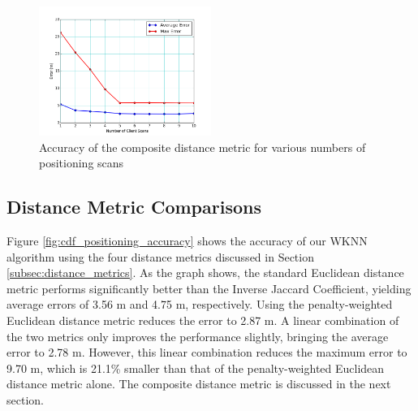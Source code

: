 \documentclass[conference]{IEEEtran}
\begin{document}
\begin{figure}[t!]
  \centering
    \includegraphics[width=0.5\textwidth]{pull_errors.png}
   \caption{Accuracy of the composite distance metric for various numbers of positioning scans}
   \label{fig:composite_accuracy}
\end{figure}

\subsection{Distance Metric Comparisons}
Figure \ref{fig:cdf_positioning_accuracy} shows the accuracy of our WKNN algorithm using the four distance metrics discussed in Section \ref{subsec:distance_metrics}. As the graph shows, the standard Euclidean distance metric performs significantly better than the Inverse Jaccard Coefficient, yielding average errors of 3.56 m and 4.75 m, respectively. Using the penalty-weighted Euclidean distance metric reduces the error to 2.87 m. A linear combination of the two metrics only improves the performance slightly, bringing the average error to 2.78 m. However, this linear combination reduces the maximum error to 9.70 m, which is 21.1\% smaller than that of the penalty-weighted Euclidean distance metric alone. The composite distance metric is discussed in the next section.

\begin{table}[t!]
\renewcommand{\arraystretch}{1.3}
\caption{Distance Metric Accuracy}
\label{tab:table_distance_metric_accuracy}
\centering
{}
\end{table}
\end{document}
